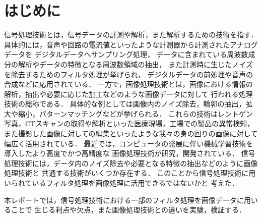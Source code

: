\chapter{はじめに}


信号処理技術とは，信号データの計測や解析，また解析するための技術を指す．
具体的には，音声や回路の電流値といったような計測器から計測されたアナログデータを
デジタルデータへサンプリング処理，
データに含まれている周波数成分の解析やデータの特徴となる周波数領域の抽出，
また計測時に生じたノイズを除去するためのフィルタ処理が挙げられ，
デジタルデータの前処理や音声の合成などに応用されている．
一方で，画像処理技術とは，画像における情報の解析，抽出や必要に応じた加工などのような画像データに対して
行われる処理技術の総称である．
具体的な例としては画像内のノイズ除去，輪郭の抽出，拡大や縮小，パターンマッチングなどが挙げられる．
これらの技術はレントゲン写真，CTスキャンの取得や解析といった医療現場，工場での製品の異常検知，
また撮影した画像に対しての編集といったような我々の身の回りの画像に対して幅広く活用されている．
最近では，コンピュータの発展に伴い機械学習技術を導入したより高度でかつ高精度な
画像処理技術が研究，開発されている．
信号処理技術には，データ内のノイズ除去や必要となる特徴の抽出などのように画像処理技術と
共通する技術がいくつか存在する．
このことから信号処理技術に用いられているフィルタ処理を画像処理に活用できるではないかと
考えた．

本レポートでは，信号処理技術における一部のフィルタ処理を画像データに用いることで
生じる利点や欠点，また画像処理技術との違いを実験，検証する．

